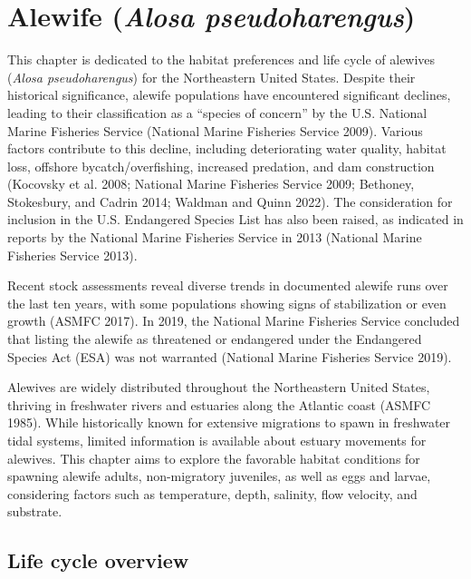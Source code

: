 \documentclass[
]{book}
\begin{document}
\hypertarget{alewife-alosa-pseudoharengus}{%
\chapter{\texorpdfstring{Alewife (\emph{Alosa pseudoharengus})}{Alewife (Alosa pseudoharengus)}}\label{alewife-alosa-pseudoharengus}}

This chapter is dedicated to the habitat preferences and life cycle of alewives (\emph{Alosa pseudoharengus}) for the Northeastern United States. Despite their historical significance, alewife populations have encountered significant declines, leading to their classification as a ``species of concern'' by the U.S. National Marine Fisheries Service (National Marine Fisheries Service 2009). Various factors contribute to this decline, including deteriorating water quality, habitat loss, offshore bycatch/overfishing, increased predation, and dam construction (Kocovsky et al. 2008; National Marine Fisheries Service 2009; Bethoney, Stokesbury, and Cadrin 2014; Waldman and Quinn 2022). The consideration for inclusion in the U.S. Endangered Species List has also been raised, as indicated in reports by the National Marine Fisheries Service in 2013 (National Marine Fisheries Service 2013).

Recent stock assessments reveal diverse trends in documented alewife runs over the last ten years, with some populations showing signs of stabilization or even growth (ASMFC 2017). In 2019, the National Marine Fisheries Service concluded that listing the alewife as threatened or endangered under the Endangered Species Act (ESA) was not warranted (National Marine Fisheries Service 2019).

Alewives are widely distributed throughout the Northeastern United States, thriving in freshwater rivers and estuaries along the Atlantic coast (ASMFC 1985). While historically known for extensive migrations to spawn in freshwater tidal systems, limited information is available about estuary movements for alewives. This chapter aims to explore the favorable habitat conditions for spawning alewife adults, non-migratory juveniles, as well as eggs and larvae, considering factors such as temperature, depth, salinity, flow velocity, and substrate.

\hypertarget{life-cycle-overview}{%
\section{Life cycle overview}\label{life-cycle-overview}}
\end{document}
